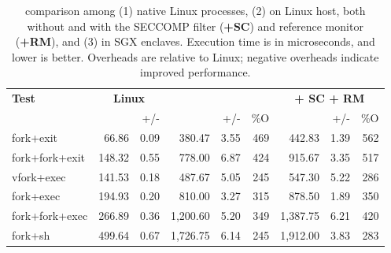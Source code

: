 \begin{table}[t!b!]
\footnotesize
\centering
\begin{tabular}{|l|rr|rrr|rrr|}
\hline
{\bf Test } & \multicolumn{2}{c|}{{\bf Linux}} & \multicolumn{3}{c|}{{\bf \graphene{}
}} & \multicolumn{3}{c|}{{\bf \graphene{} + SC + RM}} \\
&
\usec{} & +/- & 
\usec{} & +/- & \%O &
\usec{} & +/- & \%O \\

\hline
fork+exit      &  66.86 & 0.09 &   380.47 & 3.55 & 469 &   442.83 & 1.39 &   562   \\\hline
fork+fork+exit & 148.32 & 0.55 &   778.00 & 6.87 & 424 &   915.67 & 3.35 &   517   \\\hline
vfork+exec     & 141.53 & 0.18 &   487.67 & 5.05 & 245 &   547.30 & 5.22 &   286   \\\hline
fork+exec      & 194.93 & 0.20 &   810.00 & 3.27 & 315 &   878.50 & 1.89 &   350   \\\hline
fork+fork+exec & 266.89 & 0.36 & 1,200.60 & 5.20 & 349 & 1,387.75 & 6.21 &   420   \\\hline
fork+sh        & 499.64 & 0.67 & 1,726.75 & 6.14 & 245 & 1,912.00 & 3.83 &   283   \\\hline
\end{tabular}
\caption[\lmbench{} benchmarking results in Linux, KVM and \graphene{}]
{\lmbench{} comparison among (1) native Linux processes, (2) \graphene{} \picoprocs{} on Linux host, both without and with the SECCOMP filter ({\bf +SC}) and reference monitor ({\bf +RM}), and (3) \graphene{} in SGX enclaves.
Execution time is in microseconds, and lower is better. 
Overheads are relative to Linux; negative overheads indicate improved performance.} 
\label{tab:graphene:lmbench}
\end{table}



